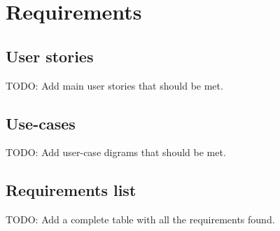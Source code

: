 \chapter{Requirements}

\section{User stories}
TODO: Add main user stories that should be met.

\section{Use-cases}
TODO: Add user-case digrams that should be met.

\section{Requirements list}
TODO: Add a complete table with all the requirements found.

%
